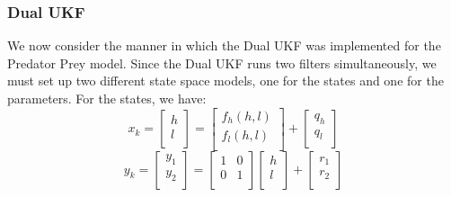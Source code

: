 \subsubsection{Dual UKF} \label{section:DualUKF}
We now consider the manner in which the Dual UKF was implemented for the Predator Prey model. Since the Dual UKF runs two filters simultaneously, we must set up two different state space models, one for the states and one for the parameters. For the states, we have:
\begin{equation}
x_k = \begin{bmatrix}
h\\
l\\
\end{bmatrix} = \begin{bmatrix}
f_h(h,l)\\
f_l(h,l)\\
\end{bmatrix} + \begin{bmatrix}
q_h\\
q_l\\
\end{bmatrix}
\end{equation}
\begin{equation}
y_k = \begin{bmatrix}
y_1\\
y_2\\
\end{bmatrix} = 
\begin{bmatrix}
1 & 0\\
0 & 1\\
\end{bmatrix}
\begin{bmatrix}
h\\
l\\
\end{bmatrix}+
\begin{bmatrix}
r_1\\
r_2\\
\end{bmatrix}
\end{equation}

